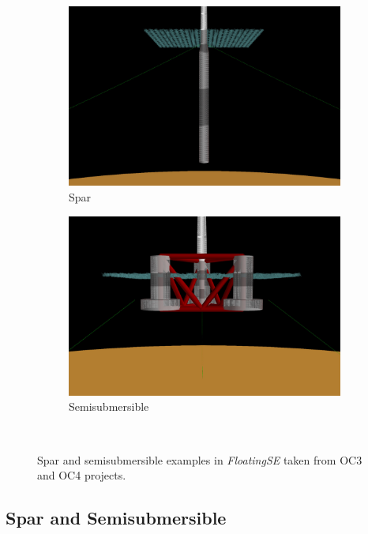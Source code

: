 \begin{figure}[htb]
  \begin{subfigure}[b]{0.49\linewidth}
    \centering \includegraphics[width=\linewidth]{figs/spar-initial.pdf}
    \caption{Spar}
  \end{subfigure}
  \begin{subfigure}[b]{0.49\linewidth}
    \centering \includegraphics[width=\linewidth]{figs/semi-initial.pdf}
    \caption{Semisubmersible}
  \end{subfigure}\\
  \caption{Spar and semisubmersible examples in \textit{FloatingSE} taken from
    OC3\citep{OC3} and OC4\citep{OC4} projects.}
  \label{fig:initial}
\end{figure}

\subsection{Spar and Semisubmersible}

